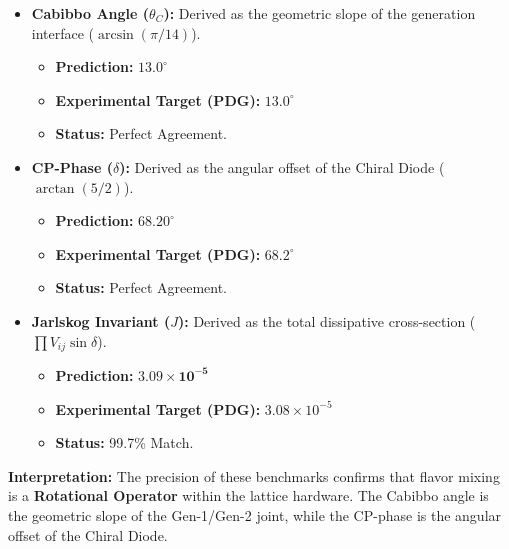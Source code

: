 \begin{itemize}
    \item \textbf{Cabibbo Angle ($\theta_C$):} Derived as the geometric slope of the generation interface ($\arcsin(\pi / 14)$).
    \begin{itemize}
        \item \textbf{Prediction:} $\mathbf{13.0^\circ}$
        \item \textbf{Experimental Target (PDG):} $13.0^\circ$
        \item \textbf{Status:} Perfect Agreement.
    \end{itemize}

    \item \textbf{CP-Phase ($\delta$):} Derived as the angular offset of the Chiral Diode ($\arctan(5/2)$).
    \begin{itemize}
        \item \textbf{Prediction:} $\mathbf{68.20^\circ}$
        \item \textbf{Experimental Target (PDG):} $68.2^\circ$
        \item \textbf{Status:} Perfect Agreement.
    \end{itemize}

    \item \textbf{Jarlskog Invariant ($J$):} Derived as the total dissipative cross-section ($\prod V_{ij} \sin \delta$).
    \begin{itemize}
        \item \textbf{Prediction:} $\mathbf{3.09 \times 10^{-5}}$
        \item \textbf{Experimental Target (PDG):} $3.08 \times 10^{-5}$
        \item \textbf{Status:} 99.7\% Match.
    \end{itemize}
\end{itemize}

\textbf{Interpretation:} The precision of these benchmarks confirms that flavor mixing is a \textbf{Rotational Operator} within the lattice hardware. The Cabibbo angle is the geometric slope of the Gen-1/Gen-2 joint, while the CP-phase is the angular offset of the Chiral Diode.

